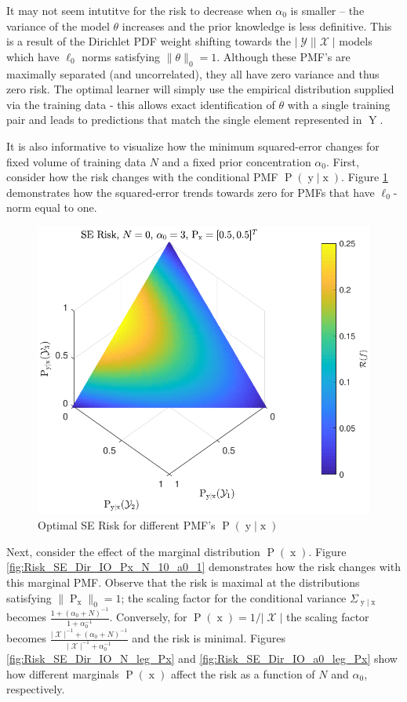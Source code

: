 \documentclass[12pt]{report}
\DeclareMathOperator{\xrm}{\mathrm{x}}
\DeclareMathOperator{\yrm}{\mathrm{y}}
\DeclareMathOperator{\Yrm}{\mathrm{Y}}
\DeclareMathOperator{\Prm}{\mathrm{P}}
\DeclareMathOperator{\Xcal}{\mathcal{X}}
\DeclareMathOperator{\Ycal}{\mathcal{Y}}
\begin{document}
It may not seem intutitve for the risk to decrease when $\alpha_0$ is smaller -- the variance of the model $\theta$ increases and the prior knowledge is less definitive. This is a result of the Dirichlet PDF weight shifting towards the $|\Ycal||\Xcal|$ models which have $\ell_0$ norms satisfying $\| \theta \|_0 = 1$. Although these PMF's are maximally separated (and uncorrelated), they all have zero variance and thus zero risk. The optimal learner will simply use the empirical distribution supplied via the training data - this allows exact identification of $\theta$ with a single training pair and leads to predictions that match the single element represented in $\Yrm$.

It is also informative to visualize how the minimum squared-error changes for fixed volume of training data $N$ and a fixed prior concentration $\alpha_0$. First, consider how the risk changes with the conditional PMF $\Prm(\yrm | \xrm)$. Figure \ref{fig:Risk_SE_Dir_IO_Pyx} demonstrates how the squared-error trends towards zero for PMFs that have $\ell_0$-norm equal to one.
\begin{figure}
\centering
\includegraphics[scale=1.0]{Risk_SE_Dir_IO_Pyx.pdf}
\caption{Optimal SE Risk for different PMF's $\Prm(\yrm | \xrm)$}
\label{fig:Risk_SE_Dir_IO_Pyx}
\end{figure}
Next, consider the effect of the marginal distribution $\Prm(\xrm)$. Figure \ref{fig:Risk_SE_Dir_IO_Px_N_10_a0_1} demonstrates how the risk changes with this marginal PMF. Observe that the risk is maximal at the distributions satisfying $\| \Prm_{\xrm} \|_0 = 1$; the scaling factor for the conditional variance $\Sigma_{\yrm | \xrm}$ becomes $\frac{1 + (\alpha_0+N)^{-1}}{1 + \alpha_0^{-1}}$. Conversely, for $\Prm(\xrm) = 1/|\Xcal|$ the scaling factor becomes $\frac{|\Xcal|^{-1} + (\alpha_0+N)^{-1}}{|\Xcal|^{-1} + \alpha_0^{-1}}$ and the risk is minimal. Figures \ref{fig:Risk_SE_Dir_IO_N_leg_Px} and \ref{fig:Risk_SE_Dir_IO_a0_leg_Px} show how different marginals $\Prm(\xrm)$ affect the risk as a function of $N$ and $\alpha_0$, respectively.
\end{document}
